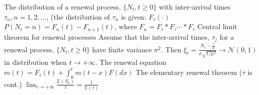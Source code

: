 \documentclass[11pt]{article}
\newenvironment{field}{}{\newpage}
\newif\ifnote
\newenvironment{note}{\notetrue}{\notefalse}
\begin{document}
%
\begin{note}
  \begin{field}
    The distribution of a renewal process, \(\{N_t, t \geq 0\}\) with
    inter-arrival times \(\tau_n, n = 1,2,\ldots\), (the distribution
    of \(\tau_n\) is given: \(F_\tau(\cdot)\)
  \end{field}
  \begin{field}
    \(P(N_t = n) = F_n(t) - F_{n+1}(t)\), where
    \(F_n = F_\tau * F_\tau \cdots * F_\tau\)
  \end{field}
\end{note}
%
\begin{note}
  \begin{field}
    Central limit theorem for renewal processes
  \end{field}
  \begin{field}
    Assume that the inter-arrival times, \(\tau_j\) for a renewal
    process, \(\{N_t, t \geq 0\}\) have finite variance
    \(\sigma^2\). Then
    \(\xi_t = \frac{N_t - \frac{t}{\mu}}{\sigma \sqrt{t / \mu^3}} \to
    \mathcal{N}(0,1)\) in distribution when \(t \to +\infty\).
  \end{field}
\end{note}
%
\begin{note}
  \begin{field}
    The renewal equation
  \end{field}
  \begin{field}
    \(m(t) = F_\tau(t) + \int_0^t m(t-x) F(dx)\)
  \end{field}
\end{note}
%
\begin{note}
  \begin{field}
    The elementary renewal theorem (\(\tau\) is cont.)
  \end{field}
  \begin{field}
    \(\lim_{t \to +\infty} \frac{\mathbb{E}(N_t)}{t} =
    \frac{1}{\mathbb{E}(\tau)}\)
  \end{field}
\end{note}
%
\end{document}
